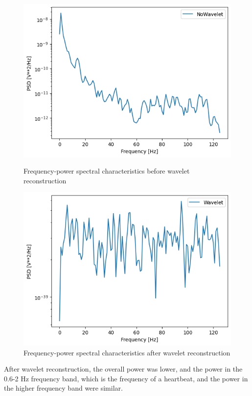 \documentclass[dvipdfmx]{article}
\begin{document}
\begin{figure}[htbp]
    \begin{minipage}[c]{0.5\hsize}
      \centering
      \includegraphics[width=\linewidth]{./img/welch_nowavelet.png}
      \caption{Frequency-power spectral characteristics before wavelet reconstruction}
    \end{minipage}
    \begin{minipage}[c]{0.5\hsize}
      \centering
      \includegraphics[width=\linewidth]{./img/welch_wavelet.png}
      \caption{Frequency-power spectral characteristics after wavelet reconstruction}
    \end{minipage}
\end{figure}
After wavelet reconstruction, the overall power was lower, and the power in the 0.6-2 Hz frequency band, which is the frequency of a heartbeat, and the power in the higher frequency band were similar.
\end{document}
